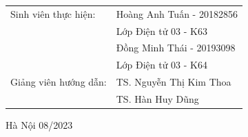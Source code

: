 \begin{titlepage}
\begin{center}
  \begin{table}[H]%
       \centering
       \begin{tabular}{l l}
            \fontsize{14pt}{0pt}\selectfont Sinh viên thực hiện:      & \fontsize{14pt}{0pt}\selectfont Hoàng Anh Tuấn - 20182856\\
              &\fontsize{14pt}{0pt}\selectfont Lớp Điện tử 03 - K63  \vspace{6pt} \\
              &\fontsize{14pt}{0pt}\selectfont Đồng Minh Thái - 20193098  \\
              &\fontsize{14pt}{0pt}\selectfont Lớp Điện tử 03 - K64 \vspace{6pt} \\
            \fontsize{14pt}{0pt}\selectfont Giảng viên hướng dẫn: & \fontsize{14pt}{0pt}\selectfont TS. Nguyễn Thị Kim Thoa \\   
              &\fontsize{14pt}{0pt}\selectfont TS. Hàn Huy Dũng \vspace{6pt} \\
       \end{tabular}
  \end{table}
  \vspace{1.3cm} %
  \fontsize{14pt}{0pt}\selectfont Hà Nội 08/2023
  \end{center}
  \end{titlepage}
  
